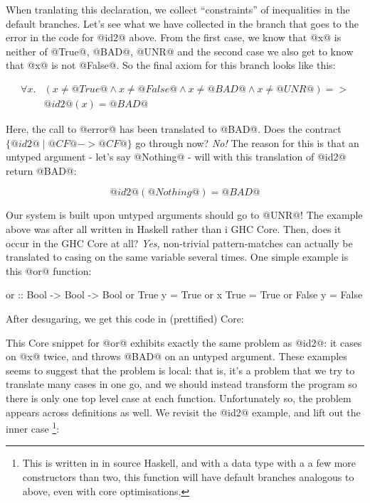 When tranlating this declaration, we collect ``constraints'' of
inequalities in the default branches. Let's see what we have collected
in the branch that goes to the error in the code for @id2@ above.
From the first case, we know that @x@ is neither of @True@, @BAD@,
@UNR@ and the second case we also get to know that @x@ is not
@False@. So the final axiom for this branch looks like this:

\[\begin{array}{rl}
\forall x . &
    (x \neq @True@ \land
     x \neq @False@ \land
     x \neq @BAD@ \land
     x \neq @UNR@) =>  \\ & @id2@(x) = @BAD@
\end{array}\]

Here, the call to @error@ has been translated to @BAD@. Does the
contract $\{ @id2@ \mid @CF@ -> @CF@ \}$ go through now? \emph{No!}
The reason for this is that an untyped argument - let's say @Nothing@ -
will with this translation of @id2@ return @BAD@:

$$@id2@(@Nothing@) = @BAD@$$

Our system is built upon untyped arguments should go to @UNR@!  The
example above was after all written in Haskell rather than i GHC Core.
Then, does it occur in the GHC Core at all? \emph{Yes,} non-trivial
pattern-matches can actually be translated to casing on the same
variable several times. One simple example is this @or@ function:

\begin{code}
    or :: Bool -> Bool -> Bool
    or True  y    = True
    or x     True = True
    or False y    = False
\end{code}

After desugaring, we get this code in (prettified) Core:

\begin{code}
or :: Bool -> Bool -> Bool
or = \ (x :: Bool) (y :: Bool) ->
    case x of {
        True -> True
        _ -> case y of {
            True -> True
            _ -> case x of {
                False -> False
                _ -> patError "function or"
\end{code}

This Core snippet for @or@ exhibits exactly the same problem as @id2@:
it cases on @x@ twice, and throws @BAD@ on an untyped argument.  These
examples seems to suggest that the problem is local: that is, it's a
problem that we try to translate many cases in one go, and we should
instead transform the program so there is only one top level case at
each function. Unfortunately so, the problem appears across
definitions as well. We revisit the @id2@ example, and lift out the
inner case
\footnote{This is written in in source Haskell, and with a data type
  with a a few more constructors than two, this function will have
  default branches analogous to above, even with core optimisations.
}:

